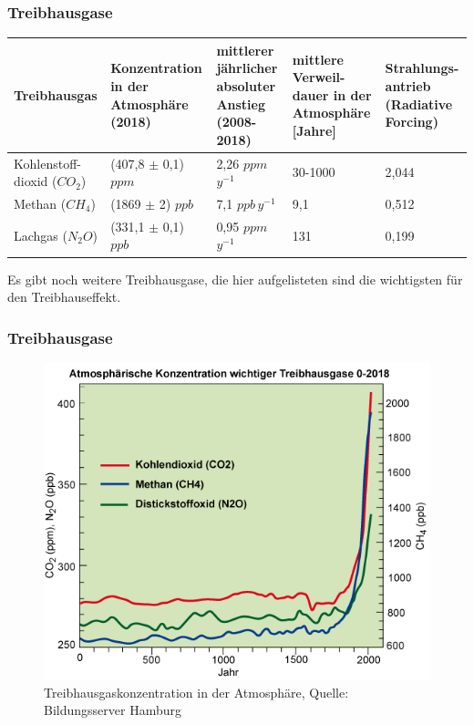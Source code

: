 \begin{frame}
	\frametitle{Treibhausgase} %
	
	
	
	
	\begin{tabular}{p{2.5cm}|p{3cm}|p{3cm}|p{2cm}|p{2cm}}
		Treibhausgas & Konzentration in der Atmosphäre (2018) & mittlerer jährlicher absoluter Anstieg (2008-2018) & mittlere Verweil-dauer in der Atmosphäre [Jahre] & Strahlungs-antrieb (Radiative Forcing) \\%
		\hline 
		Kohlenstoff-dioxid ($CO_2$) & (407,8 $\pm$ 0,1) $ppm$ & 2,26 $ppm$\,$y^{-1}$ &  30-1000 & 2,044 \\ 
		\hline 
		Methan ($CH_4$) & (1869 $\pm$ 2) $ppb$ & 7,1 $ppb$\,$y^{-1}$ &9,1 & 0,512  \\ 
		\hline 
		Lachgas ($N_2O$) & (331,1 $\pm$ 0,1) $ppb$ & 0,95 $ppm$\,$y^{-1}$ & 131 & 0,199  \\ 
	\end{tabular} 
	Es gibt noch weitere Treibhausgase, die hier aufgelisteten sind die wichtigsten für den Treibhauseffekt.
	
\end{frame}


\begin{frame}
	\frametitle{Treibhausgase}
	\begin{figure}
		\centering
		\includegraphics[width=0.6\linewidth]{bilder/Treibhausgase0-aktuell_bildungsserver_hh.jpg}
		\caption{Treibhausgaskonzentration in der Atmosphäre, Quelle: Bildungsserver Hamburg}
	\end{figure}
\end{frame}




